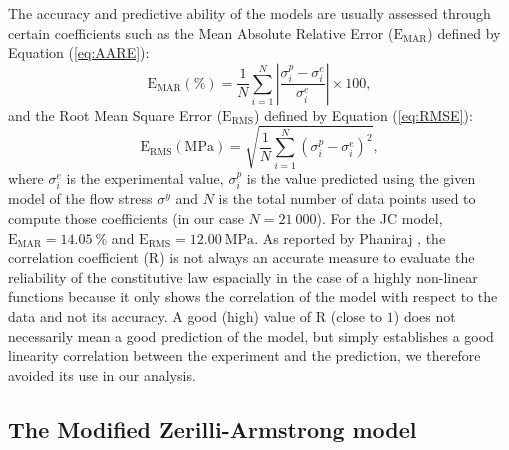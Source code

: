 \documentclass[metals,article,submit,pdftex,moreauthors]{Definitions/mdpi}
\DeclareRobustCommand{\RMSE}{\text{E}_\text{RMS}}
\DeclareRobustCommand{\MARE}{\text{E}_\text{MAR}}
\DeclareRobustCommand{\R}{\text{R}}
\DeclareRobustCommand{\MPa}{\text{MPa}}
\begin{document}
The accuracy and predictive ability of the models are usually assessed through certain coefficients such as the Mean Absolute Relative Error ($\MARE$) defined by Equation (\ref{eq:AARE}):
\begin{equation}
\MARE(\%) = \frac{1}{N} \sum_{i=1}^{N}{\left|\frac{\sigma_i^p -\sigma_i^e}{\sigma_i^e}\right|} \times 100, \label{eq:AARE}
\end{equation}
and the Root Mean Square Error ($\RMSE$) defined by Equation (\ref{eq:RMSE}):
\begin{equation}
\RMSE (\MPa) = \sqrt{\frac{1}{N} \sum_{i=1}^{N} \left(\sigma_i^p - \sigma_i^e\right)^2}, \label{eq:RMSE}
\end{equation}
where $\sigma_i^e$ is the experimental value, $\sigma_i^p$ is the value predicted using the given model of the flow stress $\sigma^y$ and $N$ is the total number of data points used to compute those coefficients (in our case $N=21~000$).
For the JC model, $\MARE=14.05~\%$ and $\RMSE=12.00~\MPa$.
As reported by Phaniraj \cite{Phaniraj-2003},  the correlation coefficient ($\R$) is not always an accurate measure to evaluate the reliability of the constitutive law espacially in the case of a highly non-linear functions because it only shows the correlation of the model with respect to the data and not its accuracy.
A good (high) value of $\R$ (close to $1$) does not necessarily mean a good prediction of the model, but simply establishes a good linearity correlation between the experiment and the prediction, we therefore avoided its use in our analysis.

\subsection{The Modified Zerilli-Armstrong model\label{sec:MZA}}
\end{document}
